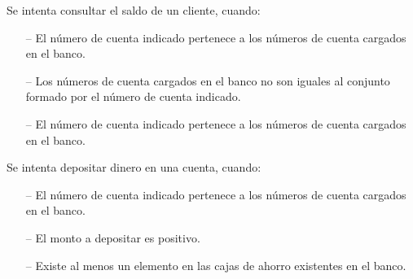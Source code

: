 \begin{tcolorbox}[colback=gray!5!white,colframe=gray!50!black,
  colbacktitle=gray!75!black,title=PedirSaldo\_SP\_2]
  Se intenta consultar el saldo de un cliente, cuando:
     \begin{itemize}
        \item[--]{El número de cuenta indicado pertenece a los números de cuenta cargados en el banco.}
        \item[--]{Los números de cuenta cargados en el banco no son iguales al conjunto formado por el número de cuenta indicado.}
        \item[--]{El número de cuenta indicado pertenece a los números de cuenta cargados en el banco.}
     \end{itemize}
\end{tcolorbox}



\begin{tcolorbox}[colback=gray!5!white,colframe=gray!50!black,
  colbacktitle=gray!75!black,title=Depositar\_SP\_3]
  Se intenta depositar dinero en una cuenta, cuando:
     \begin{itemize}
        \item[--]{El número de cuenta indicado pertenece a los números de cuenta cargados en el banco.}
        \item[--]{El monto a depositar es positivo.}
        \item[--]{Existe al menos un elemento en las cajas de ahorro existentes en el banco.}
     \end{itemize}
\end{tcolorbox}



